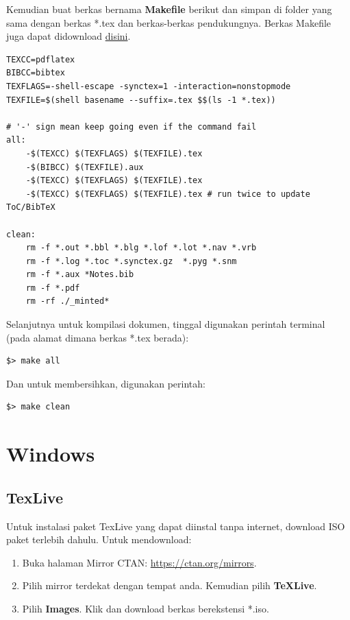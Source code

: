 \documentclass{book} %
\begin{document}
	Kemudian buat berkas bernama \textbf{Makefile} berikut dan simpan di folder yang sama dengan berkas *.tex dan berkas-berkas pendukungnya.
	Berkas Makefile juga dapat didownload \href{https://github.com/mekatronik-achmadi/my_latexbook/blob/master/Modul/LaTex/Makefile}{disini}.
	\begin{verbatim}
TEXCC=pdflatex
BIBCC=bibtex
TEXFLAGS=-shell-escape -synctex=1 -interaction=nonstopmode
TEXFILE=$(shell basename --suffix=.tex $$(ls -1 *.tex))

# '-' sign mean keep going even if the command fail
all:
	-$(TEXCC) $(TEXFLAGS) $(TEXFILE).tex
	-$(BIBCC) $(TEXFILE).aux
	-$(TEXCC) $(TEXFLAGS) $(TEXFILE).tex
	-$(TEXCC) $(TEXFLAGS) $(TEXFILE).tex # run twice to update ToC/BibTeX

clean:
	rm -f *.out *.bbl *.blg *.lof *.lot *.nav *.vrb
	rm -f *.log *.toc *.synctex.gz  *.pyg *.snm
	rm -f *.aux *Notes.bib
	rm -f *.pdf
	rm -rf ./_minted*
	\end{verbatim}

	Selanjutnya untuk kompilasi dokumen, tinggal digunakan perintah terminal (pada alamat dimana berkas *.tex berada):

	\begin{verbatim}
$> make all
	\end{verbatim}

	Dan untuk membersihkan, digunakan perintah:

	\begin{verbatim}
$> make clean
	\end{verbatim}

	\section{Windows}

	\subsection{TexLive}

	Untuk instalasi paket TexLive yang dapat diinstal tanpa internet, download ISO paket terlebih dahulu.
	Untuk mendownload:
	\begin{enumerate}
		\item Buka halaman Mirror CTAN: \url{https://ctan.org/mirrors}.
		\item Pilih mirror terdekat dengan tempat anda. Kemudian pilih \textbf{\TeX Live}.
		\item Pilih \textbf{Images}. Klik dan download berkas berekstensi *.iso.
	\end{enumerate}
\end{document}
